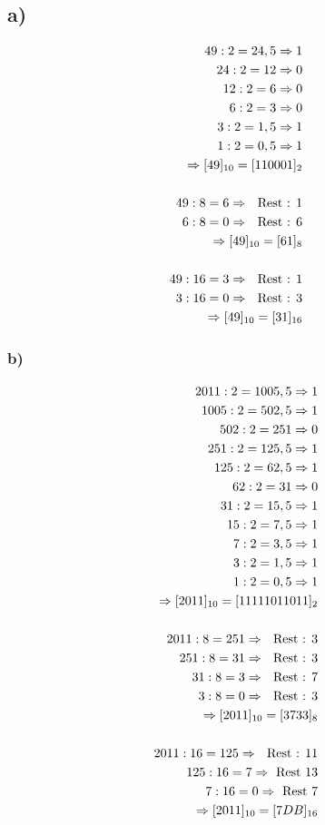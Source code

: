\documentclass[12pt,a4paper]{article}
\begin{document}
\subsection*{a)}
\begin{align*}
49 : 2 = 24,5 \Rightarrow 1 \\
24 : 2 = 12 \Rightarrow 0 \\
12 : 2 = 6 \Rightarrow 0 \\
6 : 2 = 3 \Rightarrow 0 \\
3 : 2 = 1,5 \Rightarrow 1 \\
1 : 2 = 0,5 \Rightarrow 1 \\
\Rightarrow [49]_{10} = [110001]_{2} \\
\\
49 : 8 = 6 \Rightarrow \textrm{ \textrm{ Rest }: } 1 \\
6 : 8 = 0 \Rightarrow \textrm{ \textrm{ Rest }: } 6 \\
\Rightarrow [49]_{10} = [61]_{8} \\
\\
49 : 16 = 3 \Rightarrow \textrm{ \textrm{ Rest }: } 1 \\
3 : 16 = 0 \Rightarrow \textrm{ \textrm{ Rest }: } 3 \\
\Rightarrow [49]_{10} = [31]_{16}
\end{align*}
\subsubsection*{b)}
\begin{align*}
2011 : 2 = 1005,5 \Rightarrow 1 \\
1005 : 2 = 502,5 \Rightarrow 1 \\
502 : 2 = 251 \Rightarrow 0 \\
251 : 2 = 125,5 \Rightarrow 1 \\
125 : 2 = 62,5 \Rightarrow 1 \\
62 : 2 = 31 \Rightarrow 0 \\
31 : 2 = 15,5 \Rightarrow 1 \\
15 : 2 = 7,5 \Rightarrow 1 \\
7 : 2 = 3,5 \Rightarrow 1 \\
3 : 2 = 1,5 \Rightarrow 1 \\
1 : 2 = 0,5 \Rightarrow 1 \\
\Rightarrow [2011]_{10} = [11111011011]_{2} \\
\\
2011 : 8 = 251 \Rightarrow \textrm{ \textrm{ Rest }: } 3 \\
251 : 8 = 31 \Rightarrow \textrm{ \textrm{ Rest }: } 3 \\
31 : 8 = 3 \Rightarrow \textrm{ \textrm{ Rest }: } 7 \\
3 : 8 = 0 \Rightarrow \textrm{ \textrm{ Rest }: } 3 \\
\Rightarrow [2011]_{10} = [3733]_{8} \\
\\
2011 : 16 = 125 \Rightarrow \textrm{ \textrm{ Rest }: } 11 \\
125 : 16 = 7 \Rightarrow \textrm{ Rest } 13 \\
7 : 16 = 0 \Rightarrow \textrm{ Rest } 7 \\
\Rightarrow [2011]_{10} = [7DB]_{16}
\end{align*}
\end{document}
